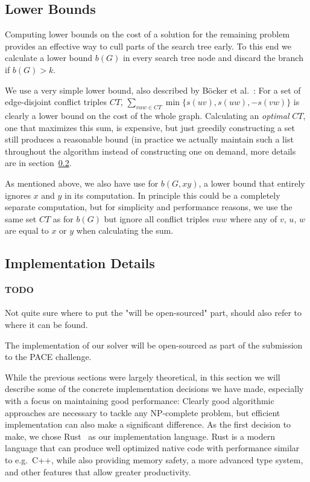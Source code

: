 \documentclass{article}
\newcommand{\todo}[1]{\paragraph{TODO} #1}
\theoremstyle{definition}
\begin{document}
\subsection{Lower Bounds}

Computing lower bounds on the cost of a solution for the remaining problem provides an effective way
to cull parts of the search tree early. To this end we calculate a lower bound $b(G)$ in every
search tree node and discard the branch if $b(G) > k$.

We use a very simple lower bound, also described by Böcker et al.~\cite{ExactAlgos}: For a set of
edge-disjoint conflict triples $CT$, $\sum_{vuw \in CT} \min\{s(uv), s(uw), -s(vw)\}$ is clearly a
lower bound on the cost of the whole graph. Calculating an \emph{optimal} $CT$, one that maximizes
this sum, is expensive, but just greedily constructing a set still produces a reasonable bound (in
practice we actually maintain such a list throughout the algorithm instead of constructing one on
demand, more details are in section~\ref{ImplDetails}.

As mentioned above, we also have use for $b(G, xy)$, a lower bound that entirely ignores $x$ and $y$
in its computation. In principle this could be a completely separate computation, but for simplicity
and performance reasons, we use the same set $CT$ as for $b(G)$ but ignore all conflict triples $vuw$
where any of $v$, $u$, $w$ are equal to $x$ or $y$ when calculating the sum.

\subsection{Implementation Details} \label {ImplDetails}

\todo Not quite sure where to put the "will be open-sourced" part, should also refer to where it can
be found.

The implementation of our solver will be open-sourced as part of the submission to the PACE
challenge.

While the previous sections were largely theoretical, in this section we will describe some of the
concrete implementation decisions we have made, especially with a focus on maintaining good
performance: Clearly good algorithmic approaches are necessary to tackle any NP-complete problem,
but efficient implementation can also make a significant difference. As the first decision to make,
we chose Rust~\cite{Rust} as our implementation language. Rust is a modern language that can produce
well optimized native code with performance similar to e.g.\ C++, while also providing memory
safety, a more advanced type system, and other features that allow greater productivity. 
\end{document}
